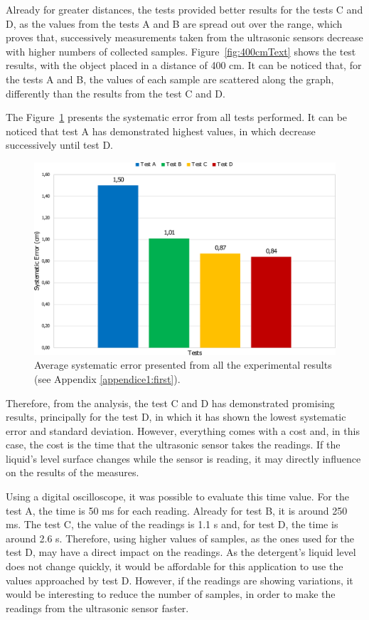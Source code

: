 Already for greater distances, the tests provided better results for the tests C and D, as the values from the tests A and B are spread out over the range, which proves that, successively measurements taken from the ultrasonic sensors decrease with higher numbers of collected samples. Figure~\ref{fig:400cmText} shows the test results, with the object placed in a distance of 400 cm. It can be noticed that, for the tests A and B, the values of each sample are scattered along the graph, differently than the results from the test C and D.

The Figure~\ref{fig:systematicError} presents the systematic error from all tests performed. It can be noticed that test A has demonstrated highest values, in which decrease successively until test D.

\begin{figure}[h!]
    \centering
    \includegraphics[scale=0.43]{images/Results/testing_methodology/systematicError.pdf}
    \caption{Average systematic error presented from all the experimental results (see Appendix \ref{appendice1:first}).}
    \label{fig:systematicError}
\end{figure}

Therefore, from the analysis, the test C and D has demonstrated promising results, principally for the test D, in which it has shown the lowest systematic error and standard deviation. However, everything comes with a cost and, in this case, the cost is the time that the ultrasonic sensor takes the readings. If the liquid's level surface changes while the sensor is reading, it may directly influence on the results of the measures. 

Using a digital oscilloscope, it was possible to evaluate this time value. For the test A, the time is 50 ms for each reading. Already for test B, it is around 250 ms. The test C, the value of the readings is 1.1 s and, for test D, the time is around 2.6 s. Therefore, using higher values of samples, as the ones used for the test D, may have a direct impact on the readings. As the detergent's liquid level does not change quickly, it would be affordable for this application to use the values approached by test D. However, if the readings are showing variations, it would be interesting to reduce the number of samples, in order to make the readings from the ultrasonic sensor faster.

